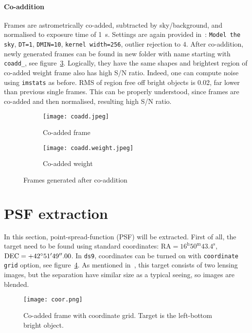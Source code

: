 \paragraph{Co-addition} 
Frames are astrometrically co-added, subtracted by sky/background, and normalised to exposure time of \SI{1}{\second}.  Settings are again provided in~\cite{manual}: \verb|Model the sky|, \verb|DT=1|, \verb|DMIN=10|, \verb|kernel width=256|, outlier rejection to $4$. After co-addition, newly generated frames can be found in new folder with name starting with \verb|coadd_|, see figure~\ref{fig:coadds}. Logically, they have the same shapes and brightest region of co-added weight frame also has high S/N ratio. Indeed, one can compute noise using \verb|imstats| as before. RMS of region free off bright objects is \num{0.02}, far lower than previous single frames. This can be properly understood, since frames are co-added and then normalised, resulting high S/N ratio.
\begin{figure}[h]
   \centering
   \begin{subfigure}[t]{0.8\textwidth}
   \begin{center}
   \texttt{[image: coadd.jpeg]}
   \end{center}
   \caption{Co-added frame}
   \label{fig:coadd}
   \end{subfigure}
   \begin{subfigure}[t]{0.8\textwidth}
   \begin{center}
   \texttt{[image: coadd.weight.jpeg]}
   \end{center}
   \caption{Co-added weight}
   \label{fig:coadd-weight}
   \end{subfigure}
   \caption{Frames generated after co-addition}%
   \label{fig:coadds}
\end{figure}

\clearpage
\section{PSF extraction}
In this section, point-spread-function (PSF) will be extracted. First of all, the target need to be found using standard coordinates: $\text{RA} = 16^\text{h}50^\text{m}43.4^\text{s}$, $\text{DEC}=+42\degree 51'49''.00$. In \verb|ds9|, coordinates can be turned on with \verb|coordinate grid| option, see figure~\ref{fig:coor-grid}. As mentioned in~\cite{manual}, this target consists of two lensing images, but the separation have similar size as a typical seeing, so images are blended.
\begin{figure}[ht]
   \centering
   \texttt{[image: coor.png]}
   \caption{Co-added frame with coordinate grid. Target is the left-bottom bright object.}%
   \label{fig:coor-grid}
\end{figure}

